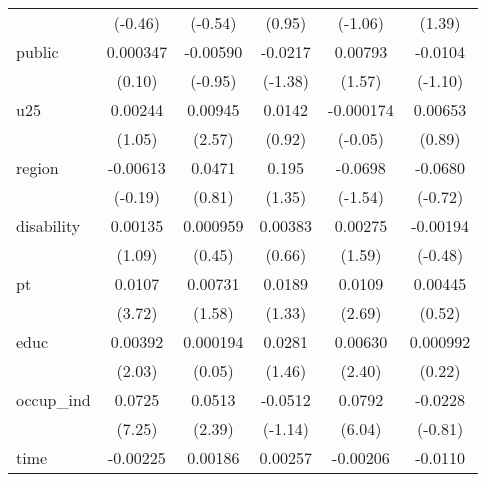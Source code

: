 {\begin{longtable}{l*{5}{c}}
            &     (-0.46)         &     (-0.54)         &      (0.95)         &     (-1.06)         &      (1.39)         \\
public      &    0.000347         &    -0.00590         &     -0.0217         &     0.00793         &     -0.0104         \\
            &      (0.10)         &     (-0.95)         &     (-1.38)         &      (1.57)         &     (-1.10)         \\
u25         &     0.00244         &     0.00945\sym{*}  &      0.0142         &   -0.000174         &     0.00653         \\
            &      (1.05)         &      (2.57)         &      (0.92)         &     (-0.05)         &      (0.89)         \\
region      &    -0.00613         &      0.0471         &       0.195         &     -0.0698         &     -0.0680         \\
            &     (-0.19)         &      (0.81)         &      (1.35)         &     (-1.54)         &     (-0.72)         \\
disability  &     0.00135         &    0.000959         &     0.00383         &     0.00275         &    -0.00194         \\
            &      (1.09)         &      (0.45)         &      (0.66)         &      (1.59)         &     (-0.48)         \\
pt          &      0.0107\sym{***}&     0.00731         &      0.0189         &      0.0109\sym{**} &     0.00445         \\
            &      (3.72)         &      (1.58)         &      (1.33)         &      (2.69)         &      (0.52)         \\
educ        &     0.00392\sym{*}  &    0.000194         &      0.0281         &     0.00630\sym{*}  &    0.000992         \\
            &      (2.03)         &      (0.05)         &      (1.46)         &      (2.40)         &      (0.22)         \\
occup\_ind   &      0.0725\sym{***}&      0.0513\sym{*}  &     -0.0512         &      0.0792\sym{***}&     -0.0228         \\
            &      (7.25)         &      (2.39)         &     (-1.14)         &      (6.04)         &     (-0.81)         \\
time        &    -0.00225         &     0.00186         &     0.00257         &    -0.00206         &     -0.0110\sym{*}  \\

\end{longtable}}
